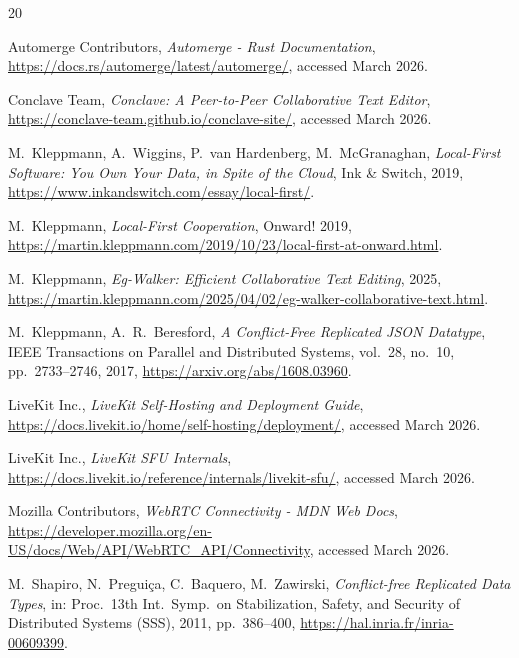\documentclass[a4paper,11pt,twoside]{report}
\theoremstyle{definition}
\begin{document}


\begin{thebibliography}{20}

 Automerge Contributors, \emph{Automerge - Rust Documentation}, \url{https://docs.rs/automerge/latest/automerge/}, accessed March 2026.

 Conclave Team, \emph{Conclave: A Peer-to-Peer Collaborative Text Editor}, \url{https://conclave-team.github.io/conclave-site/}, accessed March 2026.

 M.~Kleppmann, A.~Wiggins, P.~van Hardenberg, M.~McGranaghan, \emph{Local-First Software: You Own Your Data, in Spite of the Cloud}, Ink \& Switch, 2019, \url{https://www.inkandswitch.com/essay/local-first/}.

 M.~Kleppmann, \emph{Local-First Cooperation}, Onward! 2019, \url{https://martin.kleppmann.com/2019/10/23/local-first-at-onward.html}.

 M.~Kleppmann, \emph{Eg-Walker: Efficient Collaborative Text Editing}, 2025, \url{https://martin.kleppmann.com/2025/04/02/eg-walker-collaborative-text.html}.

 M.~Kleppmann, A.~R.~Beresford, \emph{A Conflict-Free Replicated JSON Datatype}, IEEE Transactions on Parallel and Distributed Systems, vol.~28, no.~10, pp.~2733--2746, 2017, \url{https://arxiv.org/abs/1608.03960}.

 LiveKit Inc., \emph{LiveKit Self-Hosting and Deployment Guide}, \url{https://docs.livekit.io/home/self-hosting/deployment/}, accessed March 2026.

 LiveKit Inc., \emph{LiveKit SFU Internals}, \url{https://docs.livekit.io/reference/internals/livekit-sfu/}, accessed March 2026.

 Mozilla Contributors, \emph{WebRTC Connectivity - MDN Web Docs}, \url{https://developer.mozilla.org/en-US/docs/Web/API/WebRTC_API/Connectivity}, accessed March 2026.

 M.~Shapiro, N.~Preguiça, C.~Baquero, M.~Zawirski, \emph{Conflict-free Replicated Data Types}, in: Proc.\ 13th Int.\ Symp.\ on Stabilization, Safety, and Security of Distributed Systems (SSS), 2011, pp.~386--400, \url{https://hal.inria.fr/inria-00609399}.

\end{thebibliography}
\thispagestyle{empty}
\end{document}
